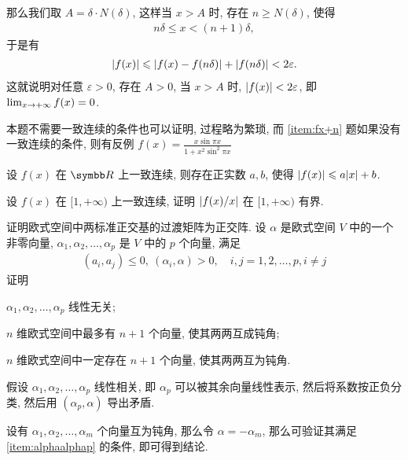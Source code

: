 \begin{exercise}[series=exer]
\begin{answer}
        那么我们取 $ A = \delta \cdot N(\delta) $, 这样当 $ x > A $ 时, 存在 $ n \ge N(\delta) $, 使得
        \begin{align*}
            n\delta \le x < (n + 1)\delta,
        \end{align*}
        于是有
        \begin{align*}
            \abs{f(x)} \leqslant \abs{f(x) - f(n\delta)} + \abs{f(n\delta)} < 2\varepsilon. 
        \end{align*}
        这就说明对任意 $ \varepsilon > 0 $, 存在 $ A > 0 $, 当 $ x > A $ 时, $ \abs{f(x)} < 2\varepsilon $, 即 $ \lim_{x \to +\infty} f(x) = 0 $. 
    \end{answer}
    \begin{remark}
        本题不需要一致连续的条件也可以证明, 过程略为繁琐, 而 \ref{item:fx+n} 题如果没有一致连续的条件, 则有反例 $ f(x) = \frac{x\sin \pi x}{1 + x^{2} \sin^{2} \pi x} $ 
    \end{remark}
    \item 设 $ f(x) $ 在 $ \R $ 上一致连续, 则存在正实数 $ a, b $, 使得 $ \abs{f(x)} \leqslant a\abs{x} + b $. 
    \item 设 $ f(x) $ 在 $ [1, +\infty) $ 上一致连续, 证明 $ \abs{f(x)/x} $ 在 $ [1, +\infty) $ 有界. 
    \item 证明欧式空间中两标准正交基的过渡矩阵为正交阵.
    \hitem 设 $ \alpha $ 是欧式空间 $ V $ 中的一个非零向量, $ \alpha_{1}, \alpha_{2}, \dots, \alpha_{p} $ 是 $ V $ 中的 $ p $ 个向量, 满足
    \begin{align*}
        (a_{i}, a_{j}) \le 0,\ (\alpha_{i}, \alpha) > 0, \quad i, j = 1, 2, \dots, p, i \ne j
    \end{align*}
    证明
    \begin{exercise}
        \item\label{item:alphaalphap} $ \alpha_{1}, \alpha_{2}, \dots, \alpha_{p} $ 线性无关;
        \item $ n $ 维欧式空间中最多有 $ n + 1 $ 个向量, 使其两两互成钝角;
        \item $ n $ 维欧式空间中一定存在 $ n + 1 $ 个向量, 使其两两互为钝角.
    \end{exercise}
    \begin{hint}
        \begin{hintsheet}
            \item 假设 $ \alpha_{1}, \alpha_{2}, \dots, \alpha_{p} $ 线性相关, 即 $ \alpha_{p} $ 可以被其余向量线性表示, 然后将系数按正负分类, 然后用 $ (\alpha_{p}, \alpha) $ 导出矛盾.
            \item 设有 $ \alpha_{1}, \alpha_{2}, \dots, \alpha_{m} $ 个向量互为钝角, 那么令 $ \alpha = -\alpha_{m} $, 那么可验证其满足 \ref{item:alphaalphap} 的条件, 即可得到结论. 

\end{hintsheet}
\end{hint}
\end{exercise}
